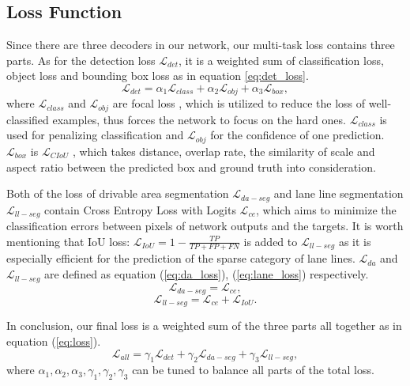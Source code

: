 \documentclass[10pt,twocolumn,letterpaper]{article}
\begin{document}
\subsection{Loss Function}
Since there are three decoders in our network, our multi-task loss contains three parts. As for the detection loss $\mathcal L_{det}$, it is a weighted sum of classification loss, object loss and bounding box loss as in equation \ref{eq:det_loss}.
\begin{equation} \label{eq:det_loss}
    \mathcal L_{det} = \alpha_1 \mathcal L_{class} + \alpha_2 \mathcal L_{obj} + \alpha_3 \mathcal L_{box},
\end{equation}
where $\mathcal L_{class}$ and $\mathcal L_{obj}$ are focal loss \cite{focalloss}, which is utilized to reduce the loss of well-classified examples, thus forces the network to focus on the hard ones. $\mathcal L_{class}$ is used for penalizing classification and $\mathcal L_{obj}$ for the confidence of one prediction. $\mathcal L_{box}$ is  $\mathcal L_{CIoU}$ \cite{d/ciouloss}, which takes distance, overlap rate, the similarity of scale and aspect ratio between the predicted box and ground truth into consideration.

Both of the loss of drivable area segmentation $\mathcal L_{da-seg}$ and lane line segmentation $\mathcal L_{ll-seg}$ contain Cross Entropy Loss with Logits $\mathcal L_{ce}$, which aims to minimize the classification errors between pixels of network outputs and the targets. It is worth mentioning that IoU loss: $\mathcal L_{IoU}=1-\frac{TP}{TP+FP+FN}$ is added to $\mathcal L_{ll-seg}$ as it is especially efficient for the prediction of the sparse category of lane lines. $\mathcal L_{da}$ and $\mathcal L_{ll-seg}$  are defined as equation (\ref{eq:da_loss}), (\ref{eq:lane_loss}) respectively.
\begin{equation} \label{eq:da_loss}
    \mathcal L_{da-seg} = \mathcal L_{ce},
\end{equation}
\begin{equation} \label{eq:lane_loss}
    \mathcal L_{ll-seg} = \mathcal L_{ce} + \mathcal L_{IoU}.
\end{equation}

In conclusion, our final loss is a weighted sum of the three parts all together as in equation (\ref{eq:loss}).
\begin{equation} \label{eq:loss}
    \mathcal L_{all} = \gamma_1 \mathcal L_{det} + \gamma_2 \mathcal L_{da-seg} + \gamma_3 \mathcal L_{ll-seg},
\end{equation}
where $\alpha_1, \alpha_2, \alpha_3, \gamma_1, \gamma_2, \gamma_3$  can be tuned to balance all parts of the total loss.
\end{document}
